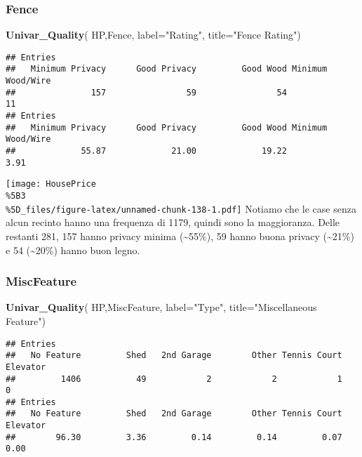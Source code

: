 \documentclass[
]{article}
\newenvironment{Shaded}{\begin{snugshade}}{\end{snugshade}}
\newcommand{\AttributeTok}[1]{\textcolor[rgb]{0.13,0.29,0.53}{#1}}
\newcommand{\FunctionTok}[1]{\textcolor[rgb]{0.13,0.29,0.53}{\textbf{#1}}}
\newcommand{\NormalTok}[1]{#1}
\newcommand{\StringTok}[1]{\textcolor[rgb]{0.31,0.60,0.02}{#1}}
\begin{document}
\subsubsection{Fence}\label{fence}

\begin{Shaded}
\begin{Highlighting}[]
\FunctionTok{Univar\_Quality}\NormalTok{(}
\NormalTok{  HP,Fence,}
  \AttributeTok{label=}\StringTok{"Rating"}\NormalTok{,}
  \AttributeTok{title=}\StringTok{"Fence Rating"}\NormalTok{)}
\end{Highlighting}
\end{Shaded}

\begin{verbatim}
## Entries
##   Minimum Privacy      Good Privacy         Good Wood Minimum Wood/Wire 
##               157                59                54                11 
## Entries
##   Minimum Privacy      Good Privacy         Good Wood Minimum Wood/Wire 
##             55.87             21.00             19.22              3.91
\end{verbatim}

\texttt{[image: HousePrice\\\%5B3\\\%5D\_files/figure-latex/unnamed-chunk-138-1.pdf]}
Notiamo che le case senza alcun recinto hanno una frequenza di 1179,
quindi sono la maggioranza. Delle restanti 281, 157 hanno privacy minima
(\textasciitilde55\%), 59 hanno buona privacy (\textasciitilde21\%) e 54
(\textasciitilde20\%) hanno buon legno.

\subsubsection{MiscFeature}\label{miscfeature}

\begin{Shaded}
\begin{Highlighting}[]
\FunctionTok{Univar\_Quality}\NormalTok{(}
\NormalTok{  HP,MiscFeature,}
  \AttributeTok{label=}\StringTok{"Type"}\NormalTok{,}
  \AttributeTok{title=}\StringTok{"Miscellaneous Feature"}\NormalTok{)}
\end{Highlighting}
\end{Shaded}

\begin{verbatim}
## Entries
##   No Feature         Shed   2nd Garage        Other Tennis Court     Elevator 
##         1406           49            2            2            1            0 
## Entries
##   No Feature         Shed   2nd Garage        Other Tennis Court     Elevator 
##        96.30         3.36         0.14         0.14         0.07         0.00
\end{verbatim}
\end{document}
